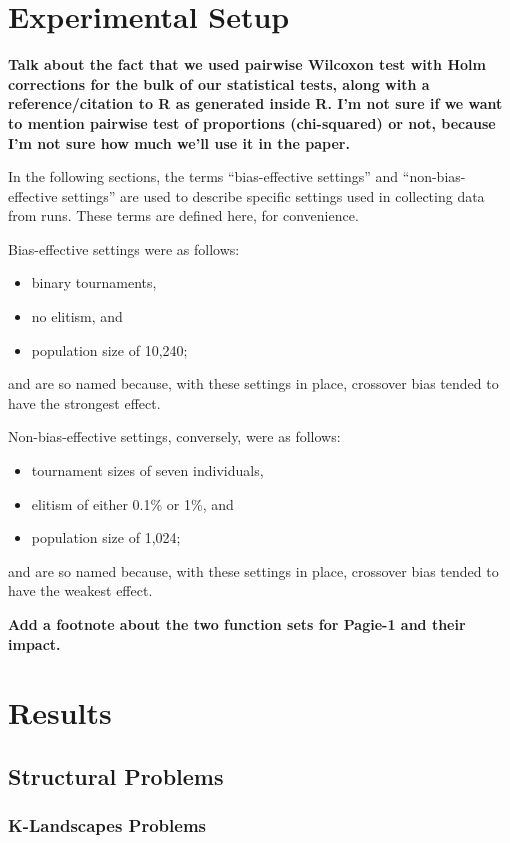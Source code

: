 \documentclass{sig-alternate}
\begin{document}
\section{Experimental Setup} \label{sec:Experiments}

\textbf{Talk about the fact that we used pairwise Wilcoxon test with Holm corrections for the bulk of our statistical 
tests, along with a reference/citation to R as generated inside R. I'm not sure if we want to mention pairwise test of 
proportions (chi-squared) or not, because I'm not sure how much we'll use it in the paper.}

In the following sections, the terms ``bias-effective settings'' and ``non-bias-effective settings'' are used to
describe specific settings used in collecting data from runs. These terms are defined here, for convenience.

Bias-effective settings were as follows:
\begin{itemize}
\item binary tournaments,
\item no elitism, and
\item population size of 10,240;
\end{itemize}
and are so named because, with these settings in place, crossover bias tended to have the strongest effect.

Non-bias-effective settings, conversely, were as follows:
\begin{itemize}
\item tournament sizes of seven individuals,
\item elitism of either 0.1\% or 1\%, and
\item population size of 1,024;
\end{itemize}
and are so named because, with these settings in place, crossover bias tended to have the weakest effect.

\textbf{Add a footnote about the two function sets for Pagie-1 and their impact.}

\section{Results} \label{sec:Results}

\subsection{Structural Problems}

\subsubsection{K-Landscapes Problems}
\end{document}

